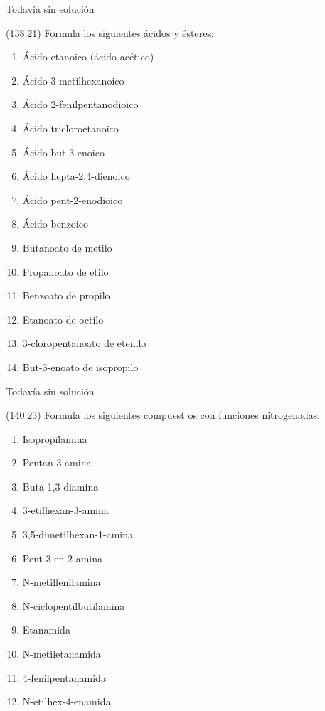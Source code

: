 \documentclass[10pt,a5paper,twoside]{article}
\begin{document}
  \begin{solution}[print=false]
    Todavía sin solución
  \end{solution}




  \begin{exercise}[
      tags    = {},
      topics  = {química, química orgánica, orgánica},
      source  = {FQ 1B MGH 2016, p138, e21},
    ]
    (138.21) Formula los siguientes ácidos y ésteres:
    \begin{enumerate}
      \item Ácido etanoico (ácido acético)
      \item Ácido 3-metilhexanoico
      \item Ácido 2-fenilpentanodioico
      \item Ácido tricloroetanoico
      \item Ácido but-3-enoico
      \item Ácido hepta-2,4-dienoico
      \item Ácido pent-2-enodioico
      \item Ácido benzoico
      \item Butanoato de metilo
      \item Propanoato de etilo
      \item Benzoato de propilo
      \item Etanoato de octilo
      \item 3-cloropentanoato de etenilo
      \item But-3-enoato de isopropilo
    \end{enumerate}
  \end{exercise}

  \begin{solution}[print=false]
    Todavía sin solución
  \end{solution}




  \begin{exercise}[
      tags    = {},
      topics  = {química, química orgánica, orgánica},
      source  = {FQ 1B MGH 2016, p140, e23},
    ]
    (140.23) Formula los siguientes compuest os con funciones nitrogenadas:
    \begin{enumerate}
      \item Isopropilamina
      \item Pentan-3-amina
      \item Buta-1,3-diamina
      \item 3-etilhexan-3-amina
      \item 3,5-dimetilhexan-1-amina
      \item Pent-3-en-2-amina
      \item N-metilfenilamina
      \item N-ciclopentilbutilamina
      \item Etanamida
      \item N-metiletanamida
      \item 4-fenilpentanamida
      \item N-etilhex-4-enamida
    \end{enumerate}
  \end{exercise}
\end{document}
